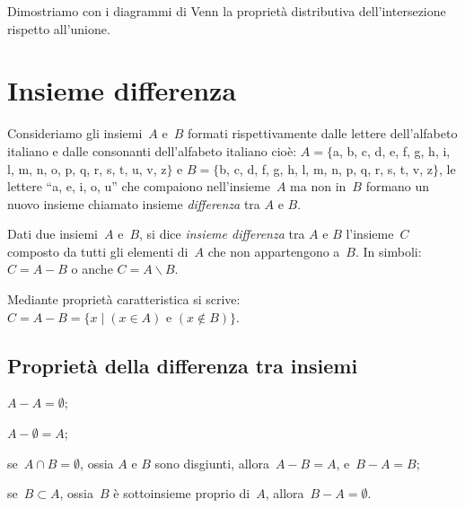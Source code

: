 Dimostriamo con i diagrammi di Venn la proprietà distributiva dell'intersezione rispetto all'unione.%
\begin{center}
 
\end{center}

\ovalbox{\risolvii \ref{ese:5.56}, \ref{ese:5.57}, \ref{ese:5.58}, \ref{ese:5.59}}

\section{Insieme differenza}

Consideriamo gli insiemi~$A$ e~$B$ formati rispettivamente
dalle lettere dell'alfabeto italiano e dalle
consonanti dell'alfabeto italiano cioè:
$A=\{$a, b, c, d, e, f, g, h, i, l, m, n, o, p, q, r, s, t, u, v, z$\}$ e
$B=\{$b, c, d, f, g, h, l, m, n, p, q, r, s, t, v, z$\}$, le lettere ``a, e, i, o, u'' che compaiono
nell'insieme~$A$ ma non in~$B$ formano un nuovo insieme chiamato insieme \emph{differenza} tra $A$ e $B$.

\begin{definizione}
 Dati due insiemi~$A$ e~$B$, si dice \emph{insieme differenza} tra $A$ e $B$ l'insieme~$C$ composto da tutti gli elementi
di~$A$ che non appartengono a~$B$. In simboli:~$C=A-B$ o anche $C=A \backslash B$.
\end{definizione}

\begin{center}

\end{center}
Mediante proprietà caratteristica si scrive:~$C=A-B=\{x\mid (x\in A)\text{ e }(x\notin B)\}$.

\subsection{Proprietà della differenza tra insiemi}

\begin{enumeratea}
\item $A-A=\emptyset$;
\item $A-\emptyset =A$;
\item se~$A\cap B=\emptyset $, ossia $A$ e $B$ sono disgiunti, allora~$A-B=A$, e~$B-A=B$;
\item se~$B\subset A$, ossia~$B$ è sottoinsieme proprio di~$A$, allora~$B-A=\emptyset $.
\end{enumeratea}

